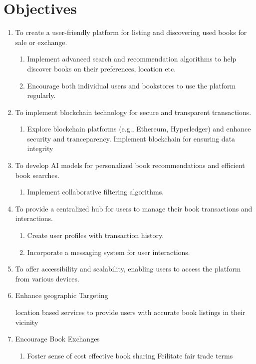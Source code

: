 \documentclass{article}
\begin{document}
\section{Objectives}
\begin{enumerate}
  \item To create a user-friendly platform for listing and discovering used books for sale or exchange.
    \begin{enumerate}
        \item Implement advanced search and recommendation algorithms to help discover books on their preferences, location etc.
        \item Encourage both individual users and bookstores to use the platform regularly.
    \end{enumerate}
  \item To implement blockchain technology for secure and transparent transactions.
    \begin{enumerate}
        \item Explore blockchain platforms (e.g., Ethereum, Hyperledger) and enhance security and tranceparency.
        \Item Implement blockchain for ensuring data integrity
    \end{enumerate}
  \item To develop AI models for personalized book recommendations and efficient book searches.
    \begin{enumerate}
        \item Implement collaborative filtering algorithms.
    \end{enumerate}
  \item To provide a centralized hub for users to manage their book transactions and interactions.
    \begin{enumerate}
        \item Create user profiles with transaction history.
        \item Incorporate a messaging system for user interactions.
    \end{enumerate}
  \item To offer accessibility and scalability, enabling users to access the platform from various devices.
  \item Enhance geographic Targeting
    \begin{enumerate}
     \Item location based services to provide users with accurate book listings in their vicinity
    \end{enumerate}
     \item Encourage Book Exchanges
    \begin{enumerate}
        \item Foster sense of cost effective book sharing
       \Item Fcilitate fair trade terms
    \end{enumerate}
\end{enumerate}
\end{document}

